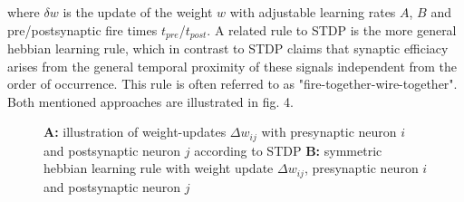 \documentclass[letterpaper, 10 pt, conference]{ieeeconf}  %
\begin{document}
where $\delta w$ is the update of the weight $w$ with adjustable learning rates $A$, $B$ and pre/postsynaptic fire times $t_{pre}$/$t_{post}$. A 
related rule to STDP is the more general hebbian learning rule, which in contrast to STDP claims that synaptic efficiacy arises from the 
general temporal proximity of these signals independent from the order of occurrence. This rule is often referred to as "fire-together-wire-together".
Both mentioned approaches are illustrated in fig. 4.

\begin{figure}[thpb]
        \centering
  \caption{\textbf{A: } illustration of weight-updates $\Delta w_{ij}$ with presynaptic neuron $i$ and postsynaptic neuron $j$ according to STDP \newline 
  \textbf{B: } symmetric hebbian learning rule with weight update $\Delta w_{ij}$, presynaptic neuron $i$ and postsynaptic neuron $j$}
        \label{figurelabel}
\end{figure}
\end{document}
